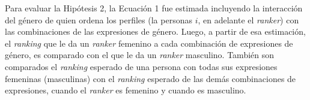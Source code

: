 Para evaluar la Hipótesis 2, la Ecuación 1 fue estimada incluyendo la interacción del género de quien ordena los perfiles (la personas $i$, en adelante el \textit{ranker}) con las combinaciones de las expresiones de género. Luego, a partir de esa estimación, el \textit{ranking} que le da un \textit{ranker} femenino  a cada combinación de expresiones de género, es comparado con el que le da un \textit{ranker} masculino. También son comparados el \textit{ranking} esperado de una persona con todas sus expresiones femeninas (masculinas) con el \textit{ranking} esperado de las demás combinaciones de expresiones, cuando el \textit{ranker} es femenino y cuando es masculino. 


\begin{table}[ht!]
    \centering
    \caption{Elección de pares a partir de expresiones de género}
    \label{tab:reg}
    \begin{threeparttable} \fontsize{8.5}{12}
\end{threeparttable}
\end{table}
